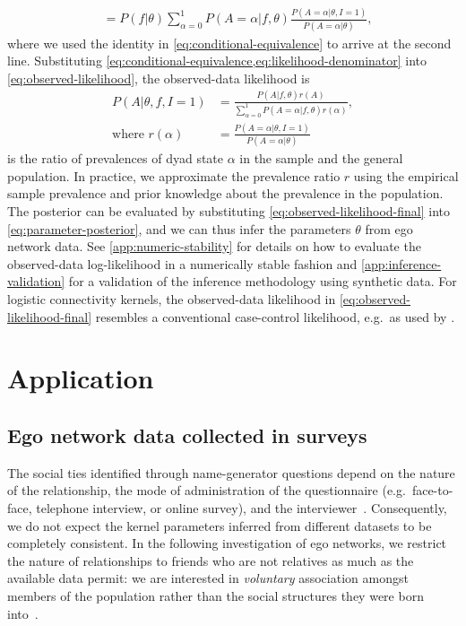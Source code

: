 \documentclass{scrartcl}
\begin{document}
\begin{refsection}
\begin{align}
    &=P(f|\theta)\sum_{\alpha=0}^1 P(A=\alpha|f,\theta)\frac{P(A=\alpha|\theta,I=1)}{P(A=\alpha|\theta)},\label{eq:likelihood-denominator}
\end{align}
where we used the identity in \cref{eq:conditional-equivalence} to arrive at the second line. Substituting \cref{eq:conditional-equivalence,eq:likelihood-denominator} into \cref{eq:observed-likelihood}, the observed-data likelihood is
\begin{align}
    P(A|\theta,f,I=1)&=\frac{P(A|f,\theta)r(A)}{\sum_{\alpha=0}^1 P(A=\alpha|f,\theta)r(\alpha)},\label{eq:observed-likelihood-final}\\
    \text{where }r(\alpha)&=\frac{P(A=\alpha|\theta,I=1)}{P(A=\alpha|\theta)}\nonumber
\end{align}
is the ratio of prevalences of dyad state $\alpha$ in the sample and the general population. In practice, we approximate the prevalence ratio $r$ using the empirical sample prevalence and prior knowledge about the prevalence in the population. The posterior can be evaluated by substituting \cref{eq:observed-likelihood-final} into \cref{eq:parameter-posterior}, and we can thus infer the parameters $\theta$ from ego network data. See \cref{app:numeric-stability} for details on how to evaluate the observed-data log-likelihood in a numerically stable fashion and \cref{app:inference-validation} for a validation of the inference methodology using synthetic data. For logistic connectivity kernels, the observed-data likelihood in \cref{eq:observed-likelihood-final} resembles a conventional case-control likelihood, e.g.\ as used by \textcite{Smith2014}.

\section{Application\label{sec:application}}

\subsection{Ego network data collected in surveys}

The social ties identified through name-generator questions depend on the nature of the relationship, the mode of administration of the questionnaire (e.g.\ face-to-face, telephone interview, or online survey), and the interviewer~\cite{Marin2004,Eagle2015}. Consequently, we do not expect the kernel parameters inferred from different datasets to be completely consistent. In the following investigation of ego networks, we restrict the nature of relationships to friends who are not relatives as much as the available data permit: we are interested in \emph{voluntary} association amongst members of the population rather than the social structures they were born into~\cite{Kalmijn2007}.


\end{refsection}
\end{document}
